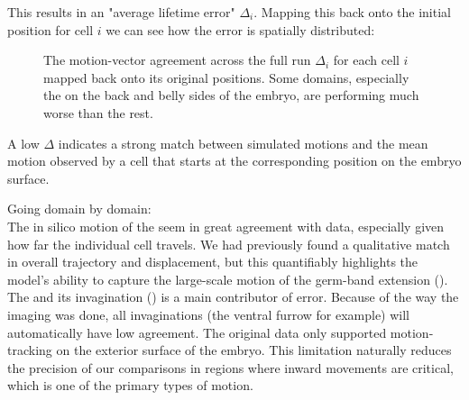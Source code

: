 This results in an "average lifetime error" $\Delta_i$. Mapping this back onto the initial position for cell $i$ we can see how the error is spatially distributed:
\begin{figure}[H]
    \centering
    \caption{The motion-vector agreement across the full run $\Delta_i$ for each cell $i$ mapped back onto its original positions. Some domains, especially the on the back and belly sides of the embryo, are performing much worse than the rest. }
    \label{fig:}
\end{figure}


A low $\Delta$ indicates a strong match between simulated motions and the mean motion observed by a cell that starts at the corresponding position on the embryo surface. 

Going domain by domain:\\

The in silico motion of the  seem in great agreement with data, especially given how far the individual cell travels. We had previously found a qualitative match in overall trajectory and displacement, but this quantifiably highlights the model's ability to capture the large-scale motion of the germ-band extension ().\\

The  and its invagination () is a main contributor of error. Because of the way the imaging was done, all invaginations (the ventral furrow for example) will automatically have low agreement. The original data only supported motion-tracking on the exterior surface of the embryo.  This limitation naturally reduces the precision of our comparisons in regions where inward movements are critical, which is one of the primary types of motion. \\

